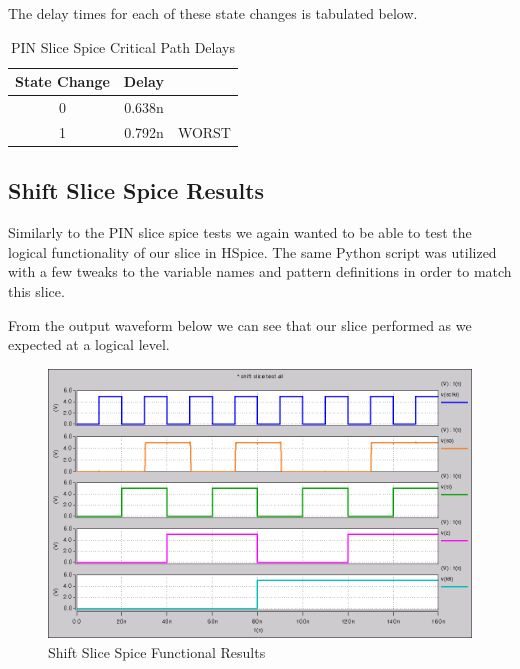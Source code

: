         \vspace{\baselineskip}
        The delay times for each of these state changes is tabulated below.

        \begin{table}[H]
            \centering
            \begin{tabular}{crc}
                \toprule
                \textbf{State Change} & \textbf{Delay} & \\
                \midrule
                0 & 0.638n & \\
                1 & 0.792n & WORST \\
                \bottomrule
            \end{tabular}
            \caption{PIN Slice Spice Critical Path Delays}
        \end{table}

    \newpage

    \subsection{Shift Slice Spice Results}

        Similarly to the PIN slice spice tests we again wanted to be able to
        test the logical functionality of our slice in HSpice. The same Python
        script was utilized with a few tweaks to the variable names and pattern
        definitions in order to match this slice.

        

        From the output waveform below we can see that our slice performed as
        we expected at a logical level.

        \begin{figure}[H]
            \centering
            \includegraphics[width=0.75\linewidth]{../../spice/shift_slice_all.png}
            \caption{Shift Slice Spice Functional Results}
        \end{figure}

